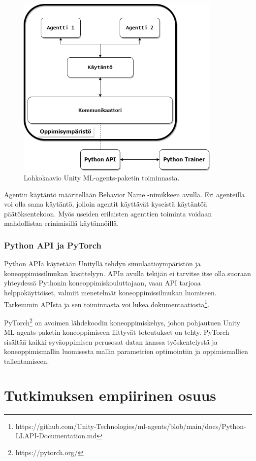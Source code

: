 \documentclass[utf8]{gradu3}
\begin{document}
\begin{figure}[h]
\centering
\includegraphics[width=10cm]{mlagents_structure.png}
\caption{Lohkokaavio Unity ML-agents-paketin toiminnasta.}
\label{mlagentsstructure}
\end{figure}

Agentin käytäntö määritellään Behavior Name -nimikkeen avulla. Eri agenteilla voi olla sama käytäntö, jolloin agentit käyttävät kyseistä käytäntöä päätöksentekoon. Myös useiden erilaisten agenttien toiminta voidaan mahdollistaa erinimisillä käytännöillä.

\subsection{Python API ja PyTorch}

Python APIa käytetään Unityllä tehdyn simulaatioympäristön ja koneoppimissilmukan käsittelyyn. APIn avulla tekijän ei tarvitse itse olla suoraan yhteydessä Pythonin koneoppimiskouluttajaan, vaan API tarjoaa helppokäyttöiset, valmiit menetelmät koneoppimissilmukan luomiseen. Tarkemmin APIsta ja sen toiminnasta voi lukea dokumentaatiosta\footnote{https://github.com/Unity-Technologies/ml-agents/blob/main/docs/Python-LLAPI-Documentation.md}.

PyTorch\footnote{https://pytorch.org/} on avoimen lähdekoodin koneoppimiskehys, johon pohjautuen Unity ML-agents-paketin koneoppimiseen liittyvät toteutukset on tehty. PyTorch sisältää kaikki syväoppimisen perusosat datan kanssa työskentelystä ja koneoppimismallin luomisesta mallin parametrien optimointiin ja oppimismallien tallentamiseen.

\chapter{Tutkimuksen empiirinen osuus}
\label{empiirinen}
\end{document}
